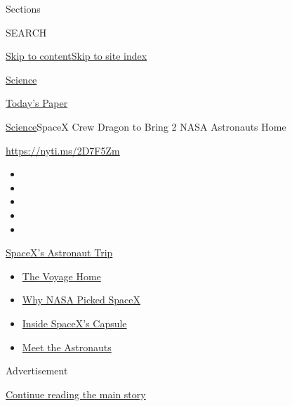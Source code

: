 Sections

SEARCH

\protect\hyperlink{site-content}{Skip to
content}\protect\hyperlink{site-index}{Skip to site index}

\href{https://www.nytimes.com/section/science}{Science}

\href{https://myaccount.nytimes.com/auth/login?response_type=cookie\&client_id=vi}{}

\href{https://www.nytimes.com/section/todayspaper}{Today's Paper}

\href{/section/science}{Science}\textbar{}SpaceX Crew Dragon to Bring 2
NASA Astronauts Home

\url{https://nyti.ms/2D7F5Zm}

\begin{itemize}
\item
\item
\item
\item
\item
\end{itemize}

\href{https://www.nytimes.com/2020/08/01/science/nasa-spacex-astronauts.html?action=click\&pgtype=Article\&state=default\&region=TOP_BANNER\&context=storylines_menu}{SpaceX's
Astronaut Trip}

\begin{itemize}
\tightlist
\item
  \href{https://www.nytimes.com/2020/08/01/science/nasa-spacex-astronauts.html?action=click\&pgtype=Article\&state=default\&region=TOP_BANNER\&context=storylines_menu}{The
  Voyage Home}
\item
  \href{https://www.nytimes.com/2020/05/26/science/spacex-launch-nasa.html?action=click\&pgtype=Article\&state=default\&region=TOP_BANNER\&context=storylines_menu}{Why
  NASA Picked SpaceX}
\item
  \href{https://www.nytimes.com/interactive/2020/05/26/science/spacex-nasa.html?action=click\&pgtype=Article\&state=default\&region=TOP_BANNER\&context=storylines_menu}{Inside
  SpaceX's Capsule}
\item
  \href{https://www.nytimes.com/2020/05/27/science/bob-behnken-doug-hurley.html?action=click\&pgtype=Article\&state=default\&region=TOP_BANNER\&context=storylines_menu}{Meet
  the Astronauts}
\end{itemize}

Advertisement

\protect\hyperlink{after-top}{Continue reading the main story}

